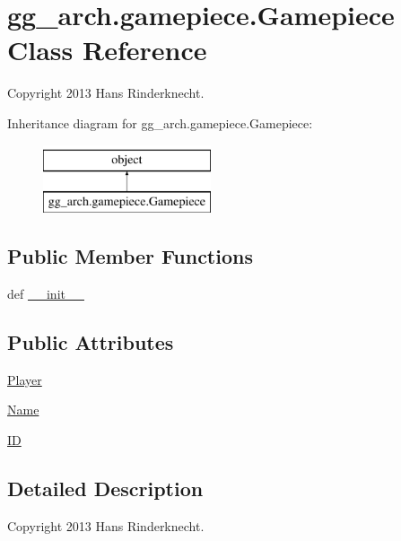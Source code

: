 \hypertarget{classgg__arch_1_1gamepiece_1_1_gamepiece}{\section{gg\-\_\-arch.\-gamepiece.\-Gamepiece Class Reference}
\label{classgg__arch_1_1gamepiece_1_1_gamepiece}
}


Copyright 2013 Hans Rinderknecht.  


Inheritance diagram for gg\-\_\-arch.\-gamepiece.\-Gamepiece\-:\begin{figure}[H]
\begin{center}
\leavevmode
\includegraphics[height=2.000000cm]{classgg__arch_1_1gamepiece_1_1_gamepiece}
\end{center}
\end{figure}
\subsection*{Public Member Functions}
\begin{DoxyCompactItemize}
\item 
def \hyperlink{classgg__arch_1_1gamepiece_1_1_gamepiece_a15a1ace087a0b3f37e83649d2a4c0e75}{\-\_\-\-\_\-init\-\_\-\-\_\-}
\end{DoxyCompactItemize}
\subsection*{Public Attributes}
\begin{DoxyCompactItemize}
\item 
\hyperlink{classgg__arch_1_1gamepiece_1_1_gamepiece_a67d3c9e6c0512a4d6c06d301afe97563}{Player}
\item 
\hyperlink{classgg__arch_1_1gamepiece_1_1_gamepiece_ab5295c356db168e281cf094c405af757}{Name}
\item 
\hyperlink{classgg__arch_1_1gamepiece_1_1_gamepiece_a0b6d70910c3fa42cf5f77bf75970bd33}{I\-D}
\end{DoxyCompactItemize}


\subsection{Detailed Description}
Copyright 2013 Hans Rinderknecht. 


